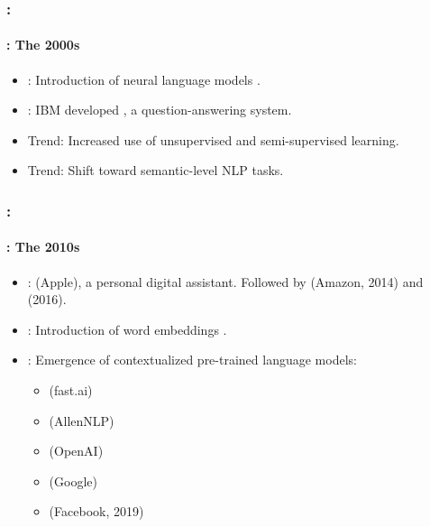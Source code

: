 \documentclass[xcolor=table]{beamer}
\begin{document}
\begin{frame}
	\frametitle{\insertshortsubtitle: \insertsection}
	\framesubtitle{\insertsubsection: The 2000s}
	
	\begin{itemize}
		\item {}: Introduction of neural language models \cite{2003-bengio-al}.
		\item {}: IBM developed , a question-answering system.
		\item Trend: Increased use of unsupervised and semi-supervised learning.
		\item Trend: Shift toward semantic-level NLP tasks.
	\end{itemize}

\end{frame}

\begin{frame}
	\frametitle{\insertshortsubtitle: \insertsection}
	\framesubtitle{\insertsubsection: The 2010s}
	
	\begin{itemize}
		\item {}:  (Apple), a personal digital assistant. Followed by  (Amazon, 2014) and  (2016).
		\item {}: Introduction of word embeddings \cite{2014-lebret-collobert}.
		\item {}: Emergence of contextualized pre-trained language models:
		\begin{itemize}
			\item {} (fast.ai) \cite{2018-howard-ruder}
			\item {} (AllenNLP) \cite{2018-peters-al}
			\item {} (OpenAI) \cite{2018-radford-al}
			\item {} (Google) \cite{2018-devlin-al}
			\item {} (Facebook, 2019) \cite{2019-lample-conneau}
		\end{itemize}
	\end{itemize}

\end{frame}
\end{document}
